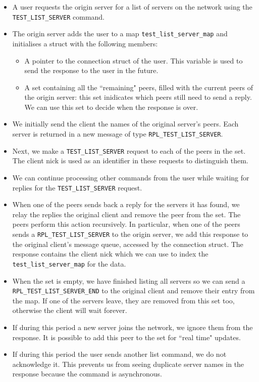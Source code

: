 \documentclass[letterpaper,twocolumn,10pt]{article}
\begin{document}
\begin{itemize}

	\item A user requests the origin server for a list of servers on the network using the \verb|TEST_LIST_SERVER| command.
	\item The origin server adds the user to a map \verb|test_list_server_map| and initialises a struct
	      with the
	      following members:
	      \begin{itemize}
		      \item A pointer to the connection struct of the user.
		            This variable is used to send the response to the user in the future.
		      \item A set containing all the ``remaining" peers, filled with the current peers of the origin server:
		            this set inidicates which peers still need to send a reply. We can use this set to decide when the response is over.
	      \end{itemize}

	\item We initially send the client the names of the original server's peers. Each
	      server is returned in a new message of type \verb|RPL_TEST_LIST_SERVER|.
	\item Next, we make a \verb|TEST_LIST_SERVER| request to each of the peers in the set.
	      The client nick is used as an identifier in these requests to distinguish them.
	\item We can continue processing other commands from the user while waiting for
	      replies for
	      the \verb|TEST_LIST_SERVER| request.
	\item When one of the peers sends back a reply for the servers it has found, we relay the replies
	      the original client and remove the peer from the set. The peers perform this action recursively. In particular, when one of the peers sends a
	      \verb|RPL_TEST_LIST_SERVER| to the origin server, we add this response to the
	      original client's message queue, accessed by the connection struct.
	      The response contains the client nick which we can use
	      to index the \verb|test_list_server_map| for the data.
	\item When the set is empty, we have finished listing all
	      servers so we can send a \verb|RPL_TEST_LIST_SERVER_END| to the
	      original client and remove their entry from the map. If one of the servers leave,
	      they are removed from this set too, otherwise the client will wait forever.
	\item If during this period a new server joins the network, we
	      ignore them from the response. It is possible to add this peer to the set for
	      ``real time" updates.
	\item If during this period the user sends another list command, we do not acknowledge it. This prevents us
	      from seeing duplicate server names in the response because the command is asynchronous.
\end{itemize}
\end{document}
